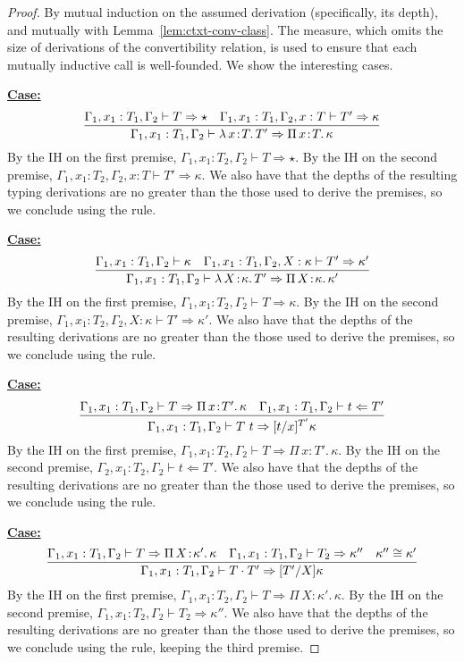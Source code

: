 \documentclass{article}
\newcommand{\abs}[4]{{#1}\, #2\! : \! #3.\, #4}
\newcommand{\tpcheck}[0]{\Leftarrow}
\newcommand{\tpsynth}[0]{\Rightarrow}
\newcommand{\startcase}[1]{\vspace{#1} \noindent\textbf{\underline{Case:}}}
\begin{document}
\begin{proof}
  By mutual induction on the assumed derivation (specifically, its depth), and
  mutually with Lemma~\ref{lem:ctxt-conv-class}.
  The measure, which omits the size of derivations of the convertibility
  relation, is used to ensure that each mutually inductive call is well-founded.
  We show the interesting cases.

  \startcase{.2cm}
  \[
    \infer{
      \Gamma_1,x_1:T_1,\Gamma_2 \vdash \abs{\lambda}{x}{T}{T'} \tpsynth \abs{\Pi}{x}{T}{\kappa}
    }{
      \Gamma_1,x_1:T_1,\Gamma_2 \vdash T \tpsynth \star
      & \Gamma_1,x_1:T_1,\Gamma_2,x:T \vdash T' \tpsynth \kappa
    }
  \]
  By the IH on the first premise, \(\Gamma_1,x_1:T_2,\Gamma_2 \vdash T \tpsynth
  \star\).
  By the IH on the second premise, \(\Gamma_1,x_1:T_2,\Gamma_2,x:T \vdash T'
  \tpsynth \kappa\).
  We also have that the depths of the resulting typing derivations are no greater than
  the those used to derive the premises, so we conclude using the rule.

  \startcase{.2cm}
  \[
    \infer{
      \Gamma_1,x_1:T_1,\Gamma_2\vdash\abs{\lambda}{X}{\kappa}{T'} \tpsynth
      \abs{\Pi}{X}{\kappa}{\kappa'}
    }{
      \Gamma_1,x_1:T_1,\Gamma_2 \vdash \kappa & \Gamma_1,x_1:T_1,\Gamma_2,X:\kappa\vdash T'\tpsynth\kappa'
    }
  \]
  By the IH on the first premise, \(\Gamma_1,x_1:T_2,\Gamma_2 \vdash T \tpsynth
  \kappa\).
  By the IH on the second premise, \(\Gamma_1,x_1:T_2,\Gamma_2,X:\kappa \vdash
  T' \tpsynth \kappa'\).
  We also have that the depths of the resulting derivations are no greater than
  the those used to derive the premises, so we conclude using the rule.

  \startcase{.2cm}
  \[
    \infer{
      \Gamma_1,x_1:T_1,\Gamma_2\vdash T\ t \tpsynth [t/x]^{T'}\kappa
    }{
      \Gamma_1,x_1:T_1,\Gamma_2 \vdash T \tpsynth \abs{\Pi}{x}{T'}{\kappa}
      & \Gamma_1,x_1:T_1,\Gamma_2 \vdash t \tpcheck T'
    }
  \]
  By the IH on the first premise, \(\Gamma_1,x_1:T_2,\Gamma_2 \vdash T \tpsynth
  \abs{\Pi}{x}{T'}{\kappa}\).
  By the IH on the second premise, \(\Gamma_2,x_1:T_2,\Gamma_2 \vdash t \tpcheck
  T'\).
  We also have that the depths of the resulting derivations are no greater than
  the those used to derive the premises, so we conclude using the rule.

  \startcase{.2cm}
  \[
    \infer{
      \Gamma_1,x_1:T_1,\Gamma_2 \vdash T \cdot T' \tpsynth [T'/X]\kappa
    }{
      \Gamma_1,x_1:T_1,\Gamma_2\vdash T \tpsynth \abs{\Pi}{X}{\kappa'}{\kappa}
      & \Gamma_1,x_1:T_1,\Gamma_2 \vdash T_2 \tpsynth \kappa'' & \kappa'' \cong \kappa'
    }
  \]
  By the IH on the first premise, \(\Gamma_1,x_1:T_2,\Gamma_2 \vdash T \tpsynth
  \abs{\Pi}{X}{\kappa'}{\kappa}\).
  By the IH on the second premise, \(\Gamma_1,x_1:T_2,\Gamma_2 \vdash T_2
  \tpsynth \kappa''\).
  We also have that the depths of the resulting derivations are no greater than
  the those used to derive the premises, so we conclude using the rule, keeping
  the third premise.


\end{proof}
\end{document}
